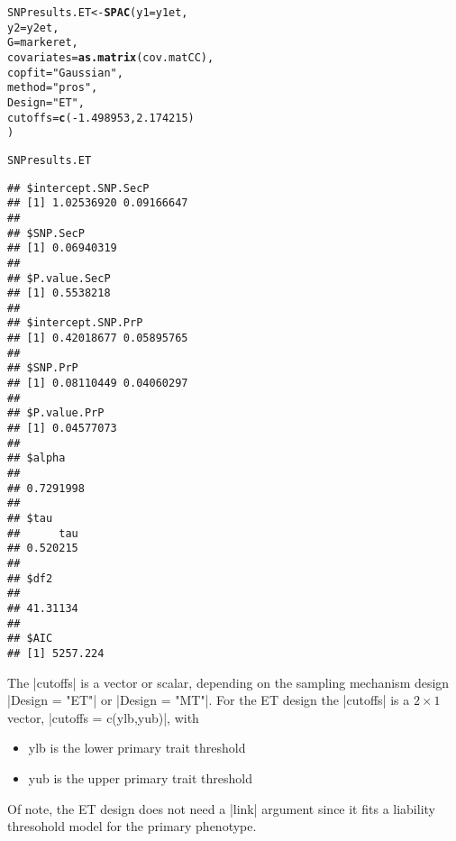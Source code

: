\documentclass{article}\usepackage[]{graphicx}\usepackage[]{color}
\makeatletter
\newcommand{\hlnum}[1]{\textcolor[rgb]{0.686,0.059,0.569}{#1}}%
\newcommand{\hlstr}[1]{\textcolor[rgb]{0.192,0.494,0.8}{#1}}%
\newcommand{\hlopt}[1]{\textcolor[rgb]{0,0,0}{#1}}%
\newcommand{\hlstd}[1]{\textcolor[rgb]{0.345,0.345,0.345}{#1}}%
\newcommand{\hlkwb}[1]{\textcolor[rgb]{0.69,0.353,0.396}{#1}}%
\newcommand{\hlkwc}[1]{\textcolor[rgb]{0.333,0.667,0.333}{#1}}%
\newcommand{\hlkwd}[1]{\textcolor[rgb]{0.737,0.353,0.396}{\textbf{#1}}}%
\newenvironment{kframe}{%
 \def\at@end@of@kframe{}%
 \ifinner\ifhmode%
  \def\at@end@of@kframe{\end{minipage}}%
  \begin{minipage}{\columnwidth}%
 \fi\fi%
 \def\FrameCommand##1{\hskip\@totalleftmargin \hskip-\fboxsep
 \colorbox{shadecolor}{##1}\hskip-\fboxsep
     \hskip-\linewidth \hskip-\@totalleftmargin \hskip\columnwidth}%
 \MakeFramed {\advance\hsize-\width
   \@totalleftmargin\z@ \linewidth\hsize
   \@setminipage}}%
 {\par\unskip\endMakeFramed%
 \at@end@of@kframe}
\newenvironment{knitrout}{}{} %
\makeatother
\begin{document}
\begin{knitrout}
\color{fgcolor}\begin{kframe}
\begin{alltt}
\hlstd{SNPresults.ET} \hlkwb{<-} \hlkwd{SPAC}\hlstd{(}\hlkwc{y1} \hlstd{= y1et,}
                   \hlkwc{y2} \hlstd{= y2et,}
                   \hlkwc{G} \hlstd{= markeret,}
                   \hlkwc{covariates} \hlstd{=} \hlkwd{as.matrix}\hlstd{(cov.matCC),}
                   \hlkwc{copfit} \hlstd{=} \hlstr{"Gaussian"}\hlstd{,}
                   \hlkwc{method} \hlstd{=} \hlstr{"pros"}\hlstd{,}
                   \hlkwc{Design} \hlstd{=} \hlstr{"ET"}\hlstd{,}
                   \hlkwc{cutoffs} \hlstd{=} \hlkwd{c}\hlstd{(}\hlopt{-}\hlnum{1.498953}\hlstd{,}\hlnum{2.174215}\hlstd{)}
                   \hlstd{)}
\end{alltt}


{\ttfamily\noindent\itshape\color{messagecolor}{\#\# Starting association analysis of the SNP...}}\begin{alltt}
\hlstd{SNPresults.ET}
\end{alltt}
\begin{verbatim}
## $intercept.SNP.SecP
## [1] 1.02536920 0.09166647
## 
## $SNP.SecP
## [1] 0.06940319
## 
## $P.value.SecP
## [1] 0.5538218
## 
## $intercept.SNP.PrP
## [1] 0.42018677 0.05895765
## 
## $SNP.PrP
## [1] 0.08110449 0.04060297
## 
## $P.value.PrP
## [1] 0.04577073
## 
## $alpha
##           
## 0.7291998 
## 
## $tau
##      tau 
## 0.520215 
## 
## $df2
##          
## 41.31134 
## 
## $AIC
## [1] 5257.224
\end{verbatim}
\end{kframe}
\end{knitrout}

The |cutoffs| is a vector or scalar, depending on the sampling mechanism design |Design = "ET"| or  |Design = "MT"|. For the ET design the |cutoffs| is a $2\times 1$ vector, |cutoffs = c(ylb,yub)|, with
\begin{itemize}
\item ylb is the lower primary trait threshold
\item yub is the upper primary trait threshold
\end{itemize}

Of note, the ET design does not need a |link| argument since it fits a liability thresohold model for the primary phenotype.
\end{document}
